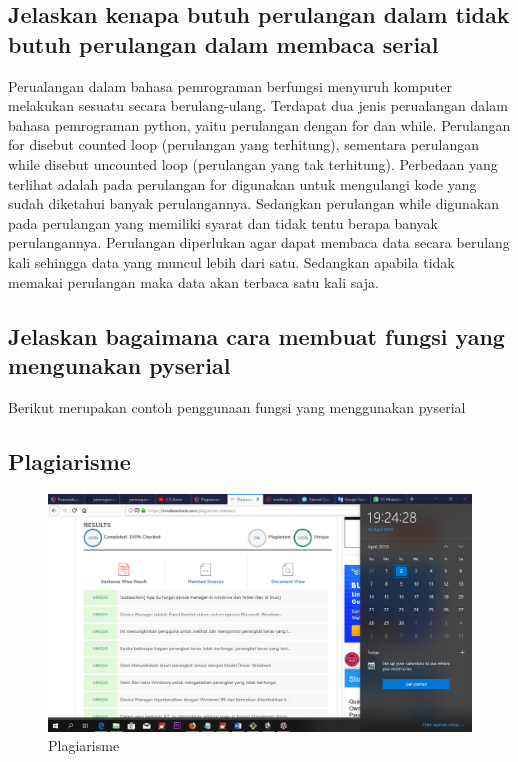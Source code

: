 \subsection{Jelaskan kenapa butuh perulangan dalam tidak butuh perulangan dalam membaca serial}
Perualangan dalam bahasa pemrograman berfungsi menyuruh komputer melakukan sesuatu secara berulang-ulang. Terdapat dua jenis perualangan dalam bahasa pemrograman python, yaitu perulangan dengan for dan while.
Perulangan for disebut counted loop (perulangan yang terhitung), sementara perulangan while disebut uncounted loop (perulangan yang tak terhitung). Perbedaan yang terlihat adalah pada perulangan for digunakan untuk mengulangi kode yang sudah diketahui banyak perulangannya. Sedangkan perulangan while digunakan pada perulangan yang memiliki syarat dan tidak tentu berapa banyak perulangannya.
Perulangan diperlukan agar dapat membaca data secara berulang kali sehingga data yang muncul lebih dari satu.  Sedangkan apabila tidak memakai perulangan maka data akan terbaca satu kali saja.

\subsection{Jelaskan bagaimana cara membuat fungsi yang mengunakan pyserial}
Berikut merupakan contoh penggunaan fungsi yang menggunakan pyserial


\subsection{Plagiarisme}
\begin{figure}[h]
\centering
\includegraphics[scale=0.2]{figures/5/Teori/1174002/plagiat.png}
\caption{Plagiarisme}
\label{fig:plagiat}
\end{figure}

